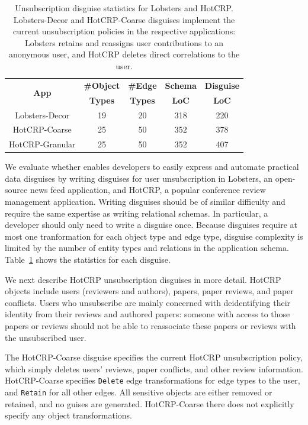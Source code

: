 \begin{table}[t!]
    \centering
    \footnotesize
    \begin{tabular}{@{}ccccc@{}}
        \multirow{2}{*}{\textbf{App}} & \textbf{\#Object} & \textbf{\#Edge} & \textbf{Schema} &
        \textbf{Disguise} \\
        & \textbf{Types} & \textbf{Types} & \textbf{LoC} & \textbf{LoC} \\
    \midrule
    Lobsters-Decor & 19 & 20 & 318 & 220 \\
    HotCRP-Coarse & 25 & 50 & 352 & 378 \\
    HotCRP-Granular & 25 & 50 & 352 & 407 \\
\end{tabular}
    \caption{Unsubscription disguise statistics for Lobsters and HotCRP. Lobsters-Decor and
    HotCRP-Coarse
    disguises implement the current unsubscription policies in the respective applications: Lobsters
    retains and reassigns user contributions to an anonymous user, and HotCRP deletes
    direct correlations to the user.}
\label{tab:loc}
\end{table}
We evaluate whether \sys enables developers to easily express and automate practical data disguises
by writing disguises for user unsubscription in Lobsters, an open-source news feed application, and
HotCRP, a popular conference review management application. Writing disguises should be of similar
difficulty and require the same expertise as writing relational schemas. In particular, a developer
should only need to write a disguise once. Because disguises require at most one tranformation for
each object type and edge type, disguise complexity is limited by the number of entity types and
relations in the application schema. Table~\ref{tab:loc} shows the statistics for each disguise. 

We next describe HotCRP unsubscription disguises in more detail. HotCRP objects include users
(reviewers and authors), papers, paper reviews, and paper conflicts.  Users who unsubscribe are
mainly concerned with deidentifying their identity from their reviews and authored papers: someone
with access to those papers or reviews should not be able to reassociate these papers or reviews
with the unsubscribed user.

The HotCRP-Coarse disguise specifies the current HotCRP unsubscription policy, which simply deletes
users' reviews, paper conflicts, and other review information. HotCRP-Coarse specifies
\texttt{Delete} edge transformations for edge types to the user, and \texttt{Retain} for all other
edges.  
%
All sensitive objects are either removed or retained, and no guises are
generated. HotCRP-Coarse there does not explicitly specify any object transformations.
%

